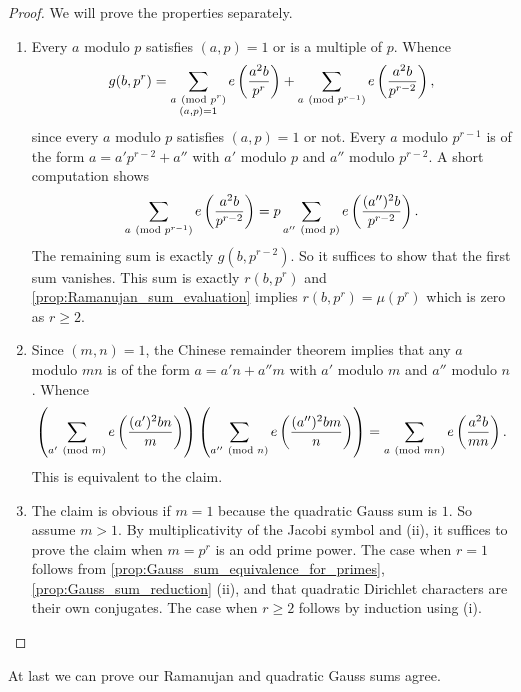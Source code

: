     \begin{proof}
      We will prove the properties separately.
      \begin{enumerate}[label*=(\roman*)]
        \item Every \(a\) modulo \(p\) satisfies \((a,p) = 1\) or is a multiple of \(p\). Whence
        \[
          g(b,p^{r}) = \sum_{\substack{a \ (\mathrm{mod}\text{ }p^{r}) \\ (a,p) = 1}}e\left(\frac{a^{2}b}{p^{r}}\right)+\sum_{a \ (\mathrm{mod}\text{ }p^{r-1})}e\left(\frac{a^{2}b}{p^{r-2}}\right),
        \]
        since every \(a\) modulo \(p\) satisfies \((a,p) = 1\) or not. Every \(a\) modulo \(p^{r-1}\) is of the form \(a = a'p^{r-2}+a''\) with \(a'\) modulo \(p\) and \(a''\) modulo \(p^{r-2}\). A short computation shows
        \[
          \sum_{a \ (\mathrm{mod}\text{ }p^{r-1})}e\left(\frac{a^{2}b}{p^{r-2}}\right) = p\sum_{a'' \ (\mathrm{mod}\text{ }p)}e\left(\frac{(a'')^{2}b}{p^{r-2}}\right).
        \]
        The remaining sum is exactly \(g(b,p^{r-2})\). So it suffices to show that the first sum vanishes. This sum is exactly \(r(b,p^{r})\) and \cref{prop:Ramanujan_sum_evaluation} implies \(r(b,p^{r}) = \mu(p^{r})\) which is zero as \(r \ge 2\).
        \item Since \((m,n) = 1\), the Chinese remainder theorem implies that any \(a\) modulo \(mn\) is of the form \(a = a'n+a''m\) with \(a'\) modulo \(m\) and \(a''\) modulo \(n\). Whence
        \[
          \left(\sum_{a' \ (\mathrm{mod}\text{ }m)}e\left(\frac{(a')^{2}bn}{m}\right)\right)\left(\sum_{a'' \ (\mathrm{mod}\text{ }n)}e\left(\frac{(a'')^{2}bm}{n}\right)\right) = \sum_{a \ (\mathrm{mod}\text{ }mn)}e\left(\frac{a^{2}b}{mn}\right).
        \]
        This is equivalent to the claim.
        \item The claim is obvious if \(m = 1\) because the quadratic Gauss sum is \(1\). So assume \(m > 1\). By multiplicativity of the Jacobi symbol and (ii), it suffices to prove the claim when \(m = p^{r}\) is an odd prime power. The case when \(r = 1\) follows from \cref{prop:Gauss_sum_equivalence_for_primes}, \cref{prop:Gauss_sum_reduction} (ii), and that quadratic Dirichlet characters are their own conjugates. The case when \(r \ge 2\) follows by induction using (i).
      \end{enumerate}
    \end{proof}

    At last we can prove our Ramanujan and quadratic Gauss sums agree.

